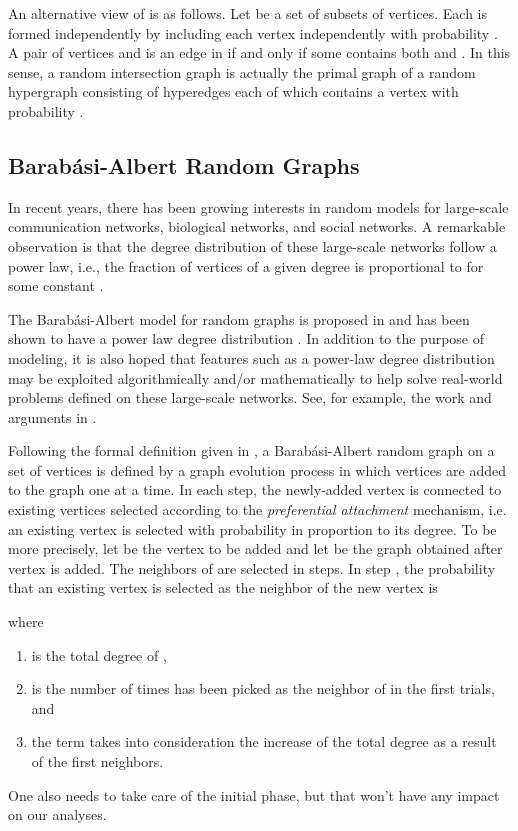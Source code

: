 \documentclass[11pt]{article}
\begin{document}
An alternative view of  is as follows. Let  be a set of 
 subsets of vertices. Each  is formed independently by including each vertex independently with probability . A pair of vertices  and  is an edge in 
  if and only if some  contains both  and . In this sense, a random intersection graph is actually the primal graph of a random hypergraph consisting of 
 hyperedges each of which contains a vertex with probability . 
 
\subsection{Barab\'{a}si-Albert Random Graphs} 
In recent years, there has been growing interests in random models for large-scale communication networks, biological networks, and social networks. A remarkable observation is that 
the degree distribution of these large-scale networks follow a power law, i.e., the fraction
of vertices of a given degree  is proportional to  for some constant
. 

The Barab\'{a}si-Albert model for random graphs is proposed in  \cite{albert02complex}          
and has been shown to have a power law degree distribution \cite{bollobas01scalefree}. In addition to the purpose of modeling, it is also hoped that features such as a power-law degree distribution may be exploited  algorithmically and/or mathematically 
to help solve real-world problems defined on these large-scale networks. See, for example, the work and arguments in \cite{cooper05,ferrante08tcs,silvio09stoc, gao09tcs}.     

Following the formal definition given in \cite{bollobas01scalefree},
a Barab\'{a}si-Albert random graph   on a set of  vertices 
 is defined by a graph evolution process in which vertices are added to the graph one at a time. In each step, the newly-added vertex is connected to
 existing vertices selected according to 
the \textit{preferential attachment} mechanism, i.e. an existing vertex is selected with probability in proportion to its degree. To be more precisely, let  be the vertex to be added and let  be the graph obtained after vertex  is added. 
The  neighbors of  are selected in  steps. In step ,  
the probability that 
an existing vertex  is selected as the neighbor of the new vertex  is 
          
where 
\begin{enumerate}
\item  is the total degree
of ,
\item  is the number of times  has been picked as the neighbor of  in the first  trials, and 
\item the term  takes into consideration the increase of the total degree as a result of the first  neighbors. 
\end{enumerate}
One also needs to take care of the initial phase, but that won't have any impact on our analyses. 
\end{document}
